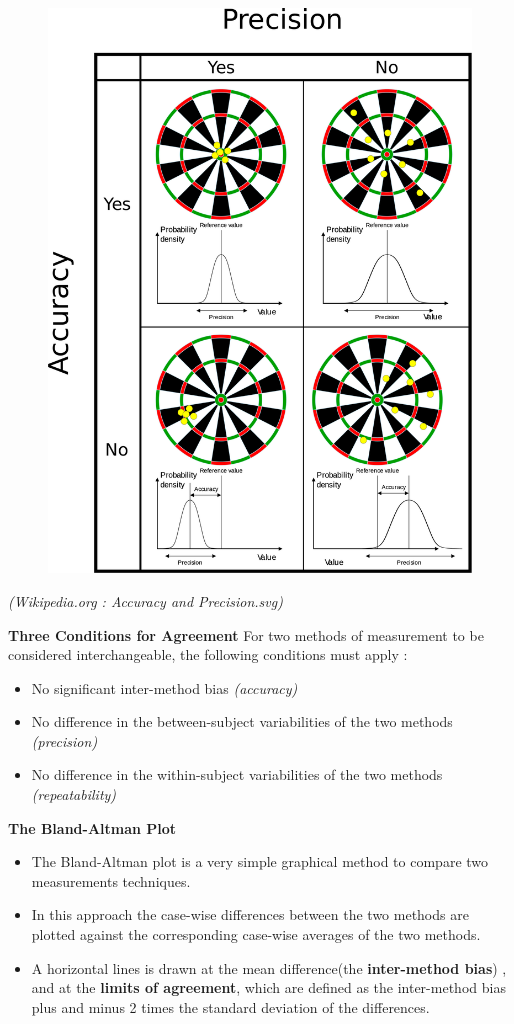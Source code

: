 \documentclass[compress]{beamer}        %
\makeatletter
\newcommand{\tcb}{\textcolor{beamer@blendedblue}}
\makeatother
\begin{document}
		\begin{frame}
			\begin{figure}
\centering
\includegraphics[width=0.45\linewidth]{images/AccuracyPrecision}
\end{figure}
\textit{(Wikipedia.org : Accuracy and Precision.svg)}
		\end{frame}
		\begin{frame}{\bf \tcb{Three Conditions for Agreement}}
			\Large
			For two methods of measurement to be considered interchangeable, the following conditions must apply \cite{Roy2009}:
			\\
			\begin{itemize}\itemsep0.5cm
				\item No significant inter-method bias \textit{(accuracy)}
				\item No difference in the between-subject variabilities of the two methods \textit{(precision)}
				\item No difference in the within-subject variabilities of the two methods \textit{(repeatability)}
			\end{itemize}
		\end{frame}
		
		\begin{frame}{\bf \tcb{The Bland-Altman Plot}}
			\large
			\begin{itemize}\itemsep0.7cm
				
				\item The Bland-Altman plot \cite{BA86,BA99} is a very simple graphical method to compare two measurements techniques. \item In this approach the case-wise differences between the two methods are plotted against the corresponding case-wise averages of the two methods.
				
				\item A horizontal lines is drawn at the mean difference(the\textbf{ inter-method bias}) , and at the \textbf{limits of agreement}, which are defined as the inter-method bias plus and minus 2 times the standard deviation of the differences.
				
			\end{itemize}
		\end{frame}
		
\end{document}
